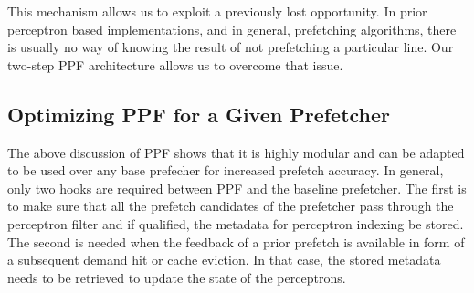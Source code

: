This mechanism allows us to exploit a previously lost opportunity.  In
prior perceptron based implementations, and in general, prefetching
algorithms, there is usually no way of knowing the result of not
prefetching a particular line.  Our two-step PPF architecture allows
us to overcome that issue.

\subsection{Optimizing PPF for a Given Prefetcher}
\label{Arch-Generalizing}
The above discussion of PPF shows that it is highly modular and can be
adapted to be used over any base prefecher for increased prefetch
accuracy.  In general, only two hooks are required between PPF and the
baseline prefetcher. The first is to make sure that all the prefetch
candidates of the prefetcher pass through the perceptron filter and if
qualified, the metadata for perceptron indexing be stored. The second
is needed when the feedback of a prior prefetch is available in form
of a subsequent demand hit or cache eviction. In that case, the stored
metadata needs to be retrieved to update the state of the perceptrons.


